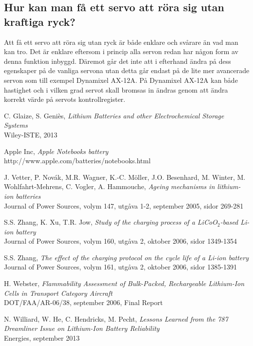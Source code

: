 \documentclass[a4paper,12pt]{article}
\begin{document}
\subsection{Hur kan man få ett servo att röra sig utan kraftiga ryck?}
Att få ett servo att röra sig utan ryck är både enklare och svårare än vad man kan tro. Det är enklare eftersom i princip alla servon redan har någon form av denna funktion inbyggd. Däremot går det inte att i efterhand ändra på dess egenskaper på de vanliga servona utan detta går endast på de lite mer avancerade servon som till exempel Dynamixel AX-12A. På Dynamixel AX-12A kan både hastighet och i vilken grad servot skall bromsas in ändras genom att ändra korrekt värde på servots kontrollregister. 

\newpage

\begin{thebibliography}{9}
 C. Glaize, S. Geniès, \emph{Lithium Batteries and other Electrochemical Storage Systems}\\ Wiley-ISTE, 2013

 Apple Inc, \emph{Apple Notebooks battery}
\\ http://www.apple.com/batteries/notebooks.html

 J. Vetter, P. Novák, M.R. Wagner, K.-C. Möller, J.O. Besenhard, M. Winter, M. Wohlfahrt-Mehrens, C. Vogler, A. Hammouche, \emph{Ageing mechanisms in lithium-ion batteries}
\\ Journal of Power Sources, volym 147, utgåva 1-2, september 2005, sidor 269-281

 S.S. Zhang, K. Xu, T.R. Jow, \emph{Study of the charging process of a LiCoO$_{2}$-based Li-ion battery}
\\ Journal of Power Sources, volym 160, utgåva 2, oktober 2006, sidor 1349-1354

 S.S. Zhang, \emph{The effect of the charging protocol on the cycle life of a Li-ion battery}
\\ Journal of Power Sources, volym 161, utgåva 2, oktober 2006, sidor 1385-1391

 H. Webster, \emph{Flammability Assessment of Bulk-Packed, Rechargeable Lithium-Ion Cells in Transport Category Aircraft}
\\DOT/FAA/AR-06/38, september 2006, Final Report

 N. Williard, W. He, C. Hendricks, M. Pecht, \emph{Lessons Learned from the 787 Dreamliner Issue on Lithium-Ion Battery Reliability}
\\Energies, september 2013


\end{thebibliography}
\end{document}
